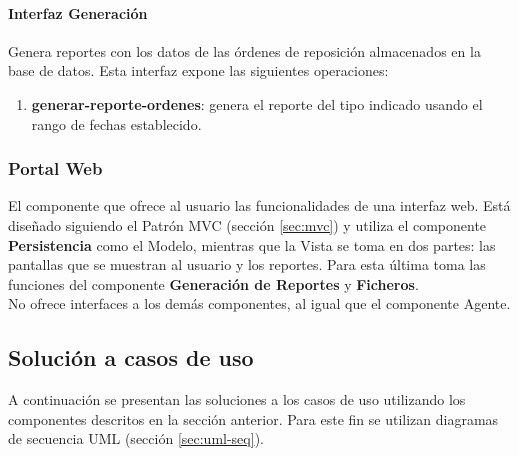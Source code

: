 \paragraph{\indent Interfaz Generación\\} Genera reportes con los datos de las órdenes de reposición almacenados en la base de datos. Esta interfaz expone las siguientes operaciones:
\begin{enumerate}
	\item \textbf{generar-reporte-ordenes}: genera el reporte del tipo indicado usando el rango de fechas establecido.
\end{enumerate}
\subsubsection{Portal Web}
El componente que ofrece al usuario las funcionalidades de una interfaz web. Está diseñado siguiendo el Patrón MVC (sección \ref{sec:mvc}) y utiliza el componente \textbf{Persistencia} como el Modelo, mientras que la Vista se toma en dos partes: las pantallas que se muestran al usuario y los reportes. Para esta última toma las funciones del componente \textbf{Generación de Reportes} y \textbf{Ficheros}.\\
No ofrece interfaces a los demás componentes, al igual que el componente Agente.
\subsection{Solución a casos de uso}
A continuación se presentan las soluciones a los casos de uso utilizando los componentes descritos en la sección anterior. Para este fin se utilizan diagramas de secuencia UML (sección \ref{sec:uml-seq}).
